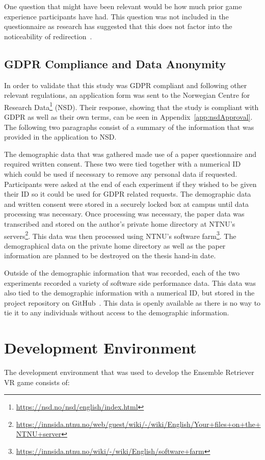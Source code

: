 One question that might have been relevant would be how much prior game experience participants have had. This question was not included in the questionnaire as research has suggested that this does not factor into the noticeability of redirection~\cite{nguyen2018individual}.

\subsection{GDPR Compliance and Data Anonymity}
In order to validate that this study was GDPR compliant and following other relevant regulations, an application form was sent to the Norwegian Centre for Research Data\footnote{\url{https://nsd.no/nsd/english/index.html}} (NSD). Their response, showing that the study is compliant with GDPR as well as their own terms, can be seen in Appendix~\ref{app:nsdApproval}. The following two paragraphs consist of a summary of the information that was provided in the application to NSD.

The demographic data that was gathered made use of a paper questionnaire and required written consent. These two were tied together with a numerical ID which could be used if necessary to remove any personal data if requested. Participants were asked at the end of each experiment if they wished to be given their ID so it could be used for GDPR related requests. The demographic data and written consent were stored in a securely locked box at campus until data processing was necessary. Once processing was necessary, the paper data was transcribed and stored on the author's private home directory at NTNU's servers\footnote{\url{https://innsida.ntnu.no/web/guest/wiki/-/wiki/English/Your+files+on+the+NTNU+server}}. This data was then processed using NTNU's software farm\footnote{\url{https://innsida.ntnu.no/wiki/-/wiki/English/software+farm}}. The demographical data on the private home directory as well as the paper information are planned to be destroyed on the thesis hand-in date.

Outside of the demographic information that was recorded, each of the two experiments recorded a variety of software side performance data. This data was also tied to the demographic information with a numerical ID, but stored in the project repository on GitHub~\cite{projectRepository}. This data is openly available as there is no way to tie it to any individuals without access to the demographic information.

\section{Development Environment}
The development environment that was used to develop the Ensemble Retriever VR game consists of: 

